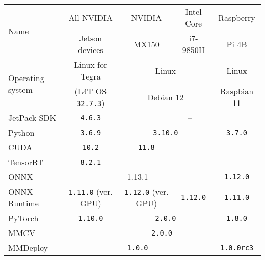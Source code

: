 \begin{table}[t]
    \centering
    \small
    \begin{threeparttable}
        \begin{tabular}{|l|c|c|c|c|}
            \hline
            \multirow{2}{*}{Name} & All NVIDIA     & NVIDIA & Intel Core  & Raspberry \\
                                & Jetson devices & MX150  & i7-9850H    & Pi 4B \\
            \hline
            \multirow{2}{*}{Operating system} & Linux for Tegra             & \multicolumn{2}{c|}{Linux}     & Linux   \\
                                            & (L4T OS \texttt{32.7.3}) & \multicolumn{2}{c|}{Debian 12} & Raspbian 11   \\
            \hline
            JetPack SDK      & \texttt{4.6.3}                     & \multicolumn{3}{c|}{--}  \\
            \hline
            Python           & \texttt{3.6.9}                     & \multicolumn{2}{c|}{\texttt{3.10.0}} & \texttt{3.7.0} \\
            \hline
            CUDA             & \texttt{10.2}                      & \texttt{11.8} & \multicolumn{2}{c|}{--} \\
            \hline
            TensorRT         & \texttt{8.2.1} & \multicolumn{3}{c|}{--}             \\
            \hline
            ONNX             & \multicolumn{3}{c|}{1.13.1} & \texttt{1.12.0}             \\
            \hline
            ONNX Runtime     & \texttt{1.11.0} (ver. GPU) & \texttt{1.12.0} (ver. GPU) & \texttt{1.12.0} & \texttt{1.11.0}            \\
            \hline
            PyTorch          & \texttt{1.10.0} & \multicolumn{2}{c|}{\texttt{2.0.0}} & \texttt{1.8.0} \\
            \hline
            MMCV             & \multicolumn{4}{c|}{\texttt{2.0.0}} \\
            \hline
            MMDeploy         & \multicolumn{3}{c|}{\texttt{1.0.0}} & \texttt{1.0.0rc3} \\

\end{tabular}
\end{threeparttable}
\end{table}
